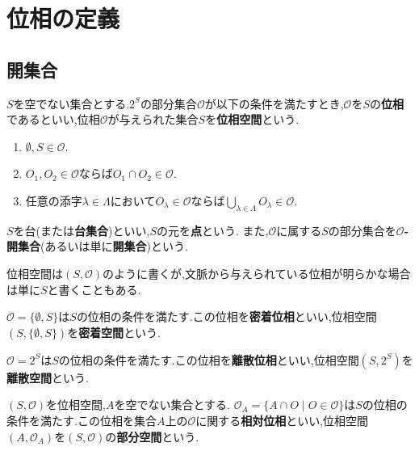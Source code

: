 \section{位相の定義}

\subsection{開集合}

\begin{framed}
    \begin{dfn}[位相の定義と開集合]\label{dfn::topology}
        $S$を空でない集合とする.$2^S$の部分集合$\mathcal{O}$が以下の条件を満たすとき,$\mathcal{O}$を$S$の\textbf{位相}であるといい,位相$\mathcal{O}$が与えられた集合$S$を\textbf{位相空間}という.

        \begin{enumerate}
            \item $\displaystyle\emptyset,S\in\mathcal{O}.$
            \item $O_1,O_2\in\mathcal{O}$ならば$O_1\cap O_2\in\mathcal{O}.$
            \item 任意の添字$\lambda\in\Lambda$において$O_\lambda\in\mathcal{O}$ならば$\displaystyle\bigcup_{\lambda\in\Lambda}O_\lambda\in\mathcal{O}.$
        \end{enumerate}

        $S$を$\textbf{台}$(または\textbf{台集合})といい,$S$の元を\textbf{点}という.
        また,$\mathcal{O}$に属する$S$の部分集合を\textbf{$\mathcal{O}$-開集合}(あるいは単に\textbf{開集合})という.

    \end{dfn}
\end{framed}

位相空間は$(S,\mathcal{O})$のように書くが,文脈から与えられている位相が明らかな場合は単に$S$と書くこともある.

\begin{exa}
    $\mathcal{O}=\{\emptyset,S\}$は$S$の位相の条件を満たす.この位相を\textbf{密着位相}といい,位相空間$(S,\{\emptyset,S\})$を\textbf{密着空間}という.
\end{exa}

\begin{exa}
    $\mathcal{O}=2^S$は$S$の位相の条件を満たす.この位相を\textbf{離散位相}といい,位相空間$(S,2^S)$を\textbf{離散空間}という.
\end{exa}

\begin{exa}
    $(S,\mathcal{O})$を位相空間,$A$を空でない集合とする.
    $\mathcal{O}_A=\{A\cap O\mid O\in\mathcal{O}\}$は$S$の位相の条件を満たす.この位相を集合$A$上の$\mathcal{O}$に関する\textbf{相対位相}といい,位相空間$(A,\mathcal{O}_A)$を$(S,\mathcal{O})$の\textbf{部分空間}という.

\end{exa}


